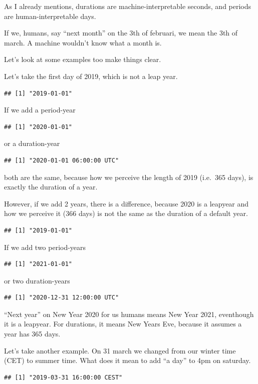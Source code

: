 \documentclass[]{tufte-book}
\begin{document}
As I already mentions, durations are machine-interpretable seconds, and periods are human-interpretable days.

If we, humans, say ``next month'' on the 3th of februari, we mean the 3th of march. A machine wouldn't know what a month is.

Let's look at some examples too make things clear.

Let's take the first day of 2019, which is not a leap year.

\begin{verbatim}
## [1] "2019-01-01"
\end{verbatim}

If we add a period-year

\begin{verbatim}
## [1] "2020-01-01"
\end{verbatim}

or a duration-year

\begin{verbatim}
## [1] "2020-01-01 06:00:00 UTC"
\end{verbatim}

both are the same, because how we perceive the length of 2019 (i.e.~365 days), is exactly the duration of a year.

However, if we add 2 years, there is a difference, because 2020 is a leapyear and how we perceive it (366 days) is not the same as the duration of a default year.

\begin{verbatim}
## [1] "2019-01-01"
\end{verbatim}

If we add two period-years

\begin{verbatim}
## [1] "2021-01-01"
\end{verbatim}

or two duration-years

\begin{verbatim}
## [1] "2020-12-31 12:00:00 UTC"
\end{verbatim}

``Next year'' on New Year 2020 for us humans means New Year 2021, eventhough it is a leapyear. For durations, it means New Years Eve, because it assumes a year has 365 days.

Let's take another example. On 31 march we changed from our winter time (CET) to summer time. What does it mean to add ``a day'' to 4pm on saturday.

\begin{verbatim}
## [1] "2019-03-31 16:00:00 CEST"
\end{verbatim}
\end{document}

